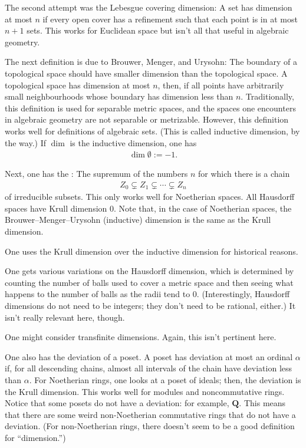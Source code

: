 \documentclass[11pt, oneside,margin=1in]{article}
\begin{document}
The second attempt was the Lebesgue covering dimension: A set has dimension at most $n$ if every open cover has a refinement such that each point is in at most $n+1$ sets. This works for Euclidean space but isn't all that useful in algebraic geometry.

The next definition is due to Brouwer, Menger, and Urysohn: The boundary of a topological space should have smaller dimension than the topological space. A topological space has dimension at most $n$, then, if all points have arbitrarily small neighbourhoods whose boundary has dimension less than $n$. Traditionally, this definition is used for separable metric spaces, and the spaces one encounters in algebraic geometry are not separable or metrizable. However, this definition works well for definitions of algebraic sets. (This is called inductive dimension, by the way.) If $\dim$ is the inductive dimension, one has
\begin{align*}
	\dim \emptyset := -1.
\end{align*}

Next, one has the : The supremum of the numbers $n$ for which there is a chain
\begin{align*}
	Z_0\subsetneq Z_1\subsetneq \cdots \subsetneq Z_n
\end{align*}
of irreducible subsets. This only works well for Noetherian spaces. All Hausdorff spaces have Krull dimension $0$. Note that, in the case of Noetherian spaces, the Brouwer--Menger--Urysohn (inductive) dimension is the same as the Krull dimension.

\begin{remark}
	One uses the Krull dimension over the inductive dimension for historical reasons.
\end{remark}

One gets various variations on the Hausdorff dimension, which is determined by counting the number of balls used to cover a metric space and then seeing what happens to the number of balls as the radii tend to $0$. (Interestingly, Hausdorff dimensions do not need to be integers; they don't need to be rational, either.) It isn't really relevant here, though.

One might consider transfinite dimensions. Again, this isn't pertinent here.

One also has the deviation of a poset. A poset has deviation at most an ordinal $\alpha$ if, for all descending chains, almost all intervals of the chain have deviation less than $\alpha$. For Noetherian rings, one looks at a poset of ideals; then, the deviation is the Krull dimension. This works well for modules and noncommutative rings. Notice that some posets do not have a deviation: for example, $\mathbf{Q}$. This means that there are some weird non-Noetherian commutative rings that do not have a deviation. (For non-Noetherian rings, there doesn't seem to be a good definition for ``dimension.'')
\end{document}
